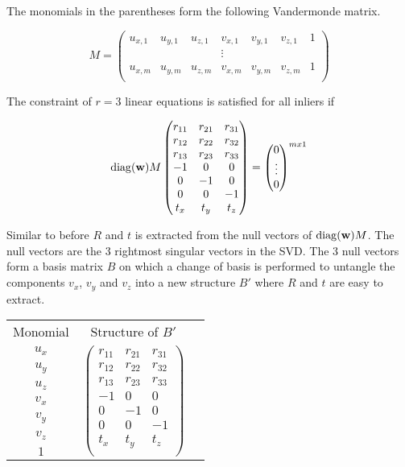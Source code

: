 The monomials in the parentheses form the following Vandermonde matrix.

\[
M=
\begin{pmatrix}
u_{x,1} & u_{y,1} & u_{z,1} & v_{x,1} & v_{y,1} & v_{z,1} & 1 \\
 & & & \vdots & & & \\
u_{x,m} & u_{y,m} & u_{z,m} & v_{x,m} & v_{y,m} & v_{z,m} & 1 \\
\end{pmatrix}
\]

The constraint of $r=3$ linear equations is satisfied for all inliers if

\[
\operatorname{diag}(\textbf{w})
M
\begin{pmatrix}
r_{11} & r_{21} & r_{31} \\
r_{12} & r_{22} & r_{32} \\
r_{13} & r_{23} & r_{33} \\
-1 & 0 & 0 \\
0 & -1 & 0 \\
0 & 0 & -1 \\
t_x & t_y & t_z \\
\end{pmatrix}
=
\begin{pmatrix}
0 \\
\vdots \\
0 \\
\end{pmatrix}
^{mx1}
\]

Similar to before $R$ and $t$ is extracted from the null vectors of $\operatorname{diag}(\textbf{w})M$. The null vectors are the 3 rightmost singular vectors in the SVD. The 3 null vectors form a basis matrix $B$ on which a change of basis is performed to untangle the components $v_x$, $v_y$ and $v_z$ into a new structure $B'$ where $R$ and $t$ are easy to extract.

\begin{center}
	\begin{tabular}{ c c c }
		Monomial & Structure of $B'$ &  \\
		$u_x$ & \multirow{7}{*}{
			$\begin{pmatrix}
			r_{11} & r_{21} & r_{31} \\
			r_{12} & r_{22} & r_{32} \\
			r_{13} & r_{23} & r_{33} \\
			-1 & 0 & 0 \\
			0 & -1 & 0 \\
			0 & 0 & -1 \\
			t_x & t_y & t_z \\
			\end{pmatrix}$
		} \\
		$u_y$ & \\
		$u_z$ & \\    
		\hline
		$v_x$ & \\
		$v_y$ & \\
		$v_z$ & \\    
		\hline
		$1$ & \\
	\end{tabular}
\end{center}

